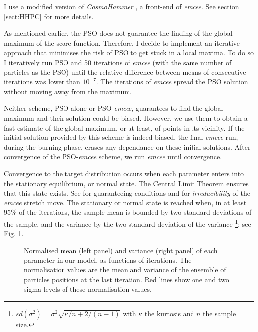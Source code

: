 I use a modified version of \emph{CosmoHammer} \citep{Akeret2013}, a front-end of \emph{emcee}. See section \ref{sect:HHPC} for more details. 

As mentioned earlier, the PSO does not guarantee the finding of the global maximum of the score function. Therefore, I decide to implement an iterative approach that minimises the risk of PSO to get stuck in a local maxima. To do so I iteratively run PSO and 50 iterations of \emph{emcee} (with the same number of particles as the PSO) until the relative difference between means of consecutive iterations was lower than $10^{-7}$. The iterations of \emph{emcee} spread the PSO solution without moving away from the maximum. 
 
Neither scheme, PSO alone or PSO-\emph{emcee}, guarantees to find the global maximum and their solution could be biased. However, we use them to obtain a fast estimate of the global maximum, or at least, of points in its vicinity. If the initial solution provided by this scheme is indeed biased, the final \emph{emcee} run, during the burning phase, erases any dependance on these initial solutions. After convergence of the PSO-\emph{emcee} scheme, we run \emph{emcee} until convergence.  
 
Convergence to the target distribution occurs when each parameter enters into the stationary equilibrium, or normal state. The Central Limit Theorem ensures that this state exists. See \citet{Roberts2004} for guaranteeing conditions and \citet{Goodman2010} for \emph{irreducibility} of the \emph{emcee} stretch move. The stationary or normal state is reached when, in at least 95\% of the iterations, the sample mean is bounded by two standard deviations of the sample, and the variance by the two standard deviation of the variance \footnote{
$sd(\sigma^2)=\sigma^2 \sqrt{\kappa/n + 2/(n-1)}$ with $\kappa$ the kurtosis and $n$ the sample size.
}; see Fig. \ref{convergence}.
\begin{figure}[htbp]
\begin{center}
\caption{Normalised mean (left panel) and variance (right panel) of each parameter in our model, as functions of iterations. The normalisation values are the mean and variance of the ensemble of particles positions at the last iteration. Red lines show one and two sigma levels of these normalisation values.}
\label{convergence}
\end{center}
\end{figure}

